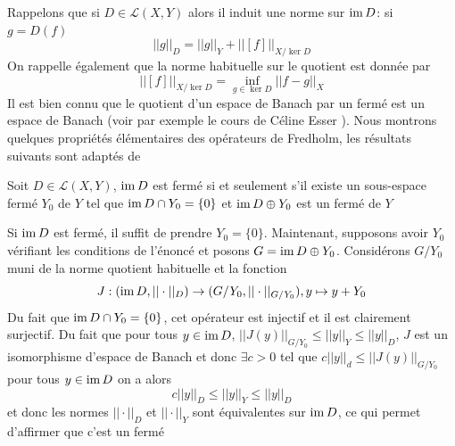 \documentclass[memoire.tex]{subfiles}
\begin{document}
Rappelons que si $D\in\mathcal{L}(X,Y)$ alors il induit une norme sur $\operatorname{im} D$: si $g=D(f)$ 
\begin{equation*}
    ||g||_{D}=||g||_{Y}+ ||[f]||_{X/\ker D}
\end{equation*}
On rappelle également  que la norme habituelle sur le quotient est donnée par 
    \begin{equation*}
        ||[f]||_{X/\ker D}= \inf_{g\in \ker D} ||f-g||_{X}
    \end{equation*}
    Il est bien connu que le quotient d'un espace de Banach par un fermé est un espace de Banach (voir par exemple le cours de Céline Esser \cite{EsserFONCT}). Nous montrons quelques propriétés élémentaires des opérateurs de Fredholm, les résultats suivants sont adaptés de \cite{abramovich2002invitation}
\begin{lemme}
    Soit $D\in\mathcal{L}(X,Y)$, $\operatorname{im} D$ est fermé si et seulement s'il existe un sous-espace fermé $Y_0$ de $Y$ tel que $\operatorname{im} D \cap Y_0=\{0\}$ et $\operatorname{im} D\oplus Y_0$ est un fermé de $Y$
\end{lemme}
\begin{preuve}
    Si $\operatorname{im} D$ est fermé, il suffit de prendre $Y_0=\{0\}$. Maintenant, supposons avoir $Y_0$ vérifiant les conditions de l'énoncé et posons $G=\operatorname{im} D\oplus Y_0$. Considérons $G/Y_0$ muni de la norme quotient habituelle et la fonction 
    \begin{equation*}
        J:  (\operatorname{im} D, ||\cdot||_D)\rightarrow (G/Y_0, ||\cdot||_{G/Y_0}), y\mapsto y+Y_0
    \end{equation*}
    Du fait que $\operatorname{im} D\cap Y_0=\{0\}$, cet opérateur est injectif et  il est clairement surjectif.  
    Du fait que pour tous $y\in\operatorname{im} D$, $||J(y)||_{G/Y_0}\leq ||y||_Y\leq ||y||_{D}$,
    $J$ est un isomorphisme d'espace de Banach et donc $\exists c>0$ tel que $c||y||_d\leq ||J(y)||_{G/Y_0}$ pour tous $y\in \operatorname{im} D $ on a alors 
    \begin{equation*}
        c ||y||_D\leq ||y||_Y\leq ||y||_D
    \end{equation*}
    et donc les normes $||\cdot ||_D$ et $||\cdot||_Y$ sont équivalentes sur $\operatorname{im} D$, ce qui permet d'affirmer que c'est un fermé
\end{preuve}
\end{document}
